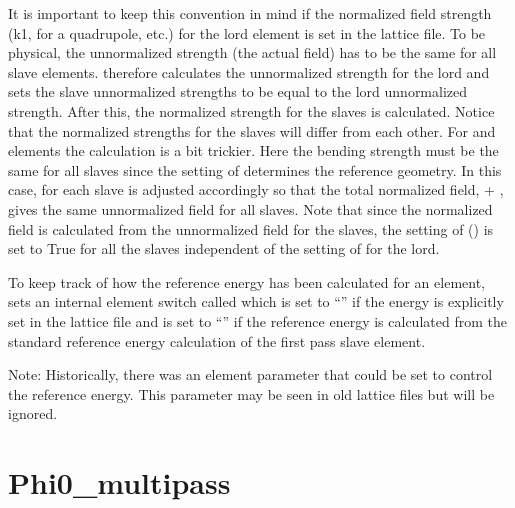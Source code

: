It is important to keep this convention in mind if the normalized field strength (k1, for a
quadrupole, etc.) for the lord element is set in the lattice file. To be physical, the unnormalized
strength (the actual field) has to be the same for all slave elements. \bmad therefore calculates
the unnormalized strength for the lord and sets the slave unnormalized strengths to be equal to the
lord unnormalized strength. After this, the normalized strength for the slaves is calculated. Notice
that the normalized strengths for the slaves will differ from each other. For  and
 elements the calculation is a bit trickier. Here the  bending strength must be the
same for all slaves since the setting of  determines the reference geometry. In this case,
 for each slave is adjusted accordingly so that the total normalized field,  +
, gives the same unnormalized field for all slaves. Note that since the normalized field
is calculated from the unnormalized field for the slaves, the setting of 
() is set to True for all the slaves independent of the setting of
 for the lord.

To keep track of how the reference energy has been calculated for an element, \bmad sets an internal
element switch called  which is set to ``'' if the energy is
explicitly set in the lattice file and is set to ``'' if the reference energy is
calculated from the standard reference energy calculation of the first pass slave element.

Note: Historically, there was an element parameter  that could be set to control the
reference energy. This parameter may be seen in old lattice files but will be ignored.

\section{Phi0_multipass}
\label{s:phi0.mp}

